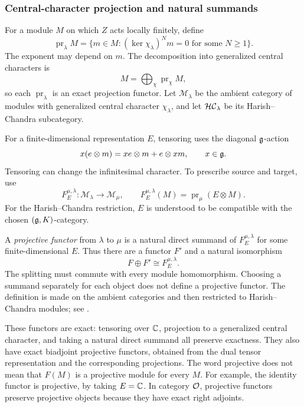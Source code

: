 \subsubsection{Central-character projection and natural summands}

For a module $M$ on which $Z$ acts locally finitely, define
\[
  \operatorname{pr}_\lambda M
  =\{m\in M:(\ker\chi_\lambda)^N m=0
                 \text{ for some }N\geq1\}.
\]
The exponent may depend on $m$. The decomposition into generalized central
characters is
\[
  M=\bigoplus_\chi\operatorname{pr}_\chi M,
\]
so each $\operatorname{pr}_\lambda$ is an exact projection functor. Let
$\mathcal M_\lambda$ be the ambient category of modules with generalized
central character $\chi_\lambda$, and let $\mathcal{HC}_\lambda$ be its
Harish--Chandra subcategory.

For a finite-dimensional representation $E$, tensoring uses the diagonal
$\mathfrak{g}$-action
\[
  x(e\otimes m)=xe\otimes m+e\otimes xm,
  \qquad x\in\mathfrak{g}.
\]
Tensoring can change the infinitesimal character. To prescribe source and
target, use
\[
  F_E^{\mu,\lambda}:\mathcal M_\lambda\longrightarrow\mathcal M_\mu,
  \qquad F_E^{\mu,\lambda}(M)=\operatorname{pr}_\mu(E\otimes M).
\]
For the Harish--Chandra restriction, $E$ is understood to be compatible
with the chosen $(\mathfrak{g},K)$-category.

\begin{defn}\label{def:strict-drop-projective-functor}
A \emph{projective functor} from $\lambda$ to $\mu$ is a natural direct
summand of $F_E^{\mu,\lambda}$ for some finite-dimensional $E$. Thus there
are a functor $F'$ and a natural isomorphism
\[
  F\oplus F'\cong F_E^{\mu,\lambda}.
\]
The splitting must commute with every module homomorphism. Choosing a
summand separately for each object does not define a projective functor.
The definition is made on the ambient categories and then restricted to
Harish--Chandra modules; see
\cite[\S2.2]{MackaayMazorchukMiemietz2024}.
\end{defn}

These functors are exact: tensoring over $\mathbb{C}$, projection to a generalized
central character, and taking a natural direct summand all preserve
exactness. They also have exact biadjoint projective functors, obtained
from the dual tensor representation and the corresponding projections.
The word projective does not mean that $F(M)$ is a projective module for
every $M$. For example, the identity functor is projective, by taking
$E=\mathbb{C}$. In category $\mathcal{O}$, projective functors preserve projective
objects because they have exact right adjoints.


